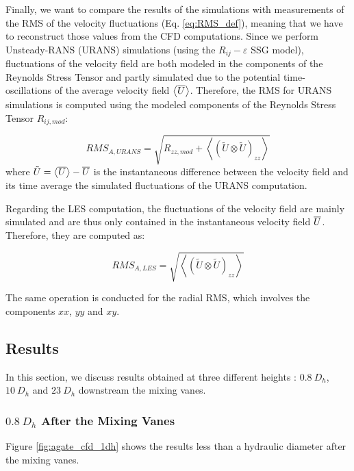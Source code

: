 Finally, we want to compare the results of the simulations with measurements of the RMS of the velocity fluctuations (Eq. \ref{eq:RMS_def}), meaning that we have to reconstruct those values from the CFD computations. Since we perform Unsteady-RANS (URANS) simulations (using the $R_{ij}-\varepsilon$ SSG model), fluctuations of the velocity field are both modeled in the components of the Reynolds Stress Tensor and partly simulated due to the potential time-oscillations of the average velocity field $\left<\overline{U}\right>$. Therefore, the RMS for URANS simulations is computed using the modeled components of the Reynolds Stress Tensor $R_{ij,mod}$:

\begin{equation}
RMS_{A,URANS} = \sqrt{R_{zz,mod} + \left< \left(\tilde{U} \otimes \tilde{U}\right)_{zz}\right>}
\label{eq:RMS_URANS}
\end{equation}
where $\tilde{U} = \left<\overline{U}\right> - \overline{U}$ is the instantaneous difference between the velocity field and its time average \ie the simulated fluctuations of the URANS computation.

\npar

Regarding the LES computation, the fluctuations of the velocity field are mainly simulated and are thus only contained in the instantaneous velocity field $\overline{U}$. Therefore, they are computed as:

\begin{equation}
RMS_{A,LES} = \sqrt{\left< \left(\tilde{U} \otimes \tilde{U}\right)_{zz} \right>}
\label{eq:RMS_LES}
\end{equation}

\npar

The same operation is conducted for the radial RMS, which involves the components ${xx}$, ${yy}$ and ${xy}$.



\subsection{Results}

In this section, we discuss results obtained at three different heights : $0.8\ D_{h}$, $10\ D_{h}$ and $23\ D_{h}$ downstream the mixing vanes.


\subsubsection{$0.8\ D_{h}$ After the Mixing Vanes}

Figure \ref{fig:agate_cfd_1dh} shows the results less than a hydraulic diameter after the mixing vanes.


